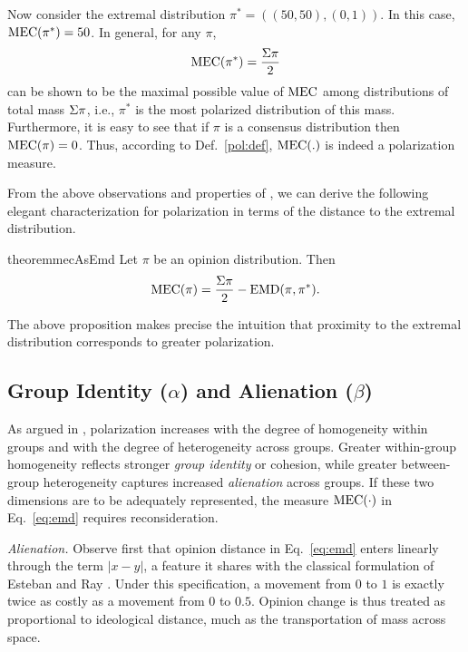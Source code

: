 Now consider the extremal distribution 
$\pi^*=((50,50),(0,1))$. 
In this case,
$
\MECEMD(\pi^*)=50
$. In general, for any $\pi$, \[ \MECEMD(\pi^*)=\frac{\Mass{\pi}}{2}\] 
can be shown to be the maximal possible value of $\MECEMD$ among 
distributions of total mass $\Sigma \pi$, i.e., $\pi^*$ is the most polarized distribution of this mass. Furthermore, it is easy to see that if $\pi$ is a consensus distribution then $\MECEMD(\pi)=0$. Thus, according to Def.~\ref{pol:def}, $\MECEMD(.)$ is indeed a polarization measure.

From the above observations and properties of \EMDLabel, we can derive the following elegant characterization for polarization in terms of the distance to the extremal distribution.

\begin{restatable}{theorem}{mecAsEmd}\label{th:mec-as-emd}
Let $\pi$ be an opinion distribution. Then  \begin{equation}
\MECEMD(\pi)=\frac{\Mass{\pi}}{2} - \EMD(\pi,\pi^*).    
\label{eq:mec-emd-1}
\end{equation}
\end{restatable}

The above proposition makes precise the intuition that proximity to the 
extremal distribution corresponds to greater polarization.

\subsection{Group Identity ($\alpha$) and Alienation ($\beta$)}
As argued in \cite{esteban1994measurement}, polarization increases with the degree of homogeneity within groups and with the degree of heterogeneity across groups. 
Greater within-group homogeneity reflects stronger \emph{group identity} or cohesion, while greater between-group heterogeneity captures increased \emph{alienation} across groups. 
If these two dimensions are to be adequately represented, the measure $\MECEMD(\cdot)$ in Eq.~\ref{eq:emd} requires reconsideration.

\emph{Alienation.}
Observe first that opinion distance in Eq.~\ref{eq:emd} enters linearly through the term $|x-y|$, a feature it shares with the classical formulation of Esteban and Ray \cite{esteban1994measurement}. 
Under this specification, a movement from $0$ to $1$ is exactly twice as costly as a movement from $0$ to $0.5$. 
Opinion change is thus treated as proportional to ideological distance, much as the transportation of mass across space.

